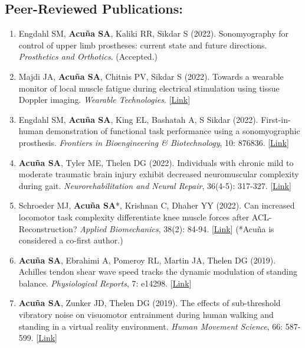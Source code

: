 \documentclass[letterpaper, 10pt]{article}
\begin{document}
\subsection{Peer-Reviewed Publications:}
\begin{enumerate}
    \item Engdahl SM, \textbf{Acuña SA}, Kaliki RR, Sikdar S (2022). Sonomyography for control of upper limb prostheses: current state and future directions. \textit{Prosthetics and Orthotics}. (Accepted.)
    \item Majdi JA, \textbf{Acuña SA}, Chitnis PV, Sikdar S (2022). Towards a wearable monitor of local muscle fatigue during electrical stimulation using tissue Doppler imaging. \textit{Wearable Technologies}. [\href{https://www.cambridge.org/core/journals/wearable-technologies/article/toward-a-wearable-monitor-of-local-muscle-fatigue-during-electrical-muscle-stimulation-using-tissue-doppler-imaging/4ADA49B3A98D245E222D5CCFDE1F180D}{Link}]
    \item Engdahl SM, \textbf{Acuña SA}, King EL, Bashatah A, S Sikdar (2022). First-in-human demonstration of functional task performance using a sonomyographic prosthesis. \textit{Frontiers in Bioengineering \& Biotechnology}, 10: 876836. [\href{https://www.frontiersin.org/articles/10.3389/fbioe.2022.876836/full}{Link}]
    \item \textbf{Acuña SA}, Tyler ME, Thelen DG (2022). Individuals with chronic mild to moderate traumatic brain injury exhibit decreased neuromuscular complexity during gait. \textit{Neurorehabilitation and Neural Repair}, 36(4-5): 317-327. [\href{https://journals.sagepub.com/doi/full/10.1177/15459683221081064}{Link}]
    \item Schroeder MJ, \textbf{Acuña SA}*, Krishnan C, Dhaher YY (2022). Can increased locomotor task complexity differentiate knee muscle forces after ACL-Reconstruction? \textit{Applied Biomechanics}, 38(2): 84-94. [\href{https://journals.humankinetics.com/view/journals/jab/38/2/article-p84.xml}{Link}] (*Acuña is considered a co-ﬁrst author.)
    \item \textbf{Acuña SA}, Ebrahimi A, Pomeroy RL, Martin JA, Thelen DG (2019). Achilles tendon shear wave speed tracks the dynamic modulation of standing balance. \textit{Physiological Reports}, 7: e14298. [\href{https://physoc.onlinelibrary.wiley.com/doi/full/10.14814/phy2.14298}{Link}]
    \item \textbf{Acuña SA}, Zunker JD, Thelen DG (2019). The effects of sub-threshold vibratory noise on visuomotor entrainment during human walking and standing in a virtual reality environment. \textit{Human Movement Science}, 66: 587-599. [\href{https://www.sciencedirect.com/science/article/abs/pii/S0167945719300582}{Link}]

\end{enumerate}
\end{document}
